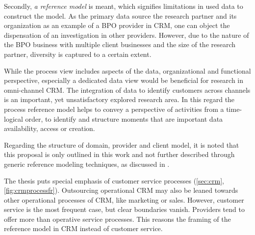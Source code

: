 Secondly, \textit{a reference model} is meant, which signifies limitations in used data to construct the model. As the primary data source the research partner and its organization as an example of a BPO provider in CRM, one can object the dispensation of an investigation in other providers. However, due to the nature of the BPO business with multiple client businesses and the size of the research partner, diversity is captured to a certain extent. 

While the process view includes aspects of the data, organizational and functional perspective, especially a dedicated data view would be beneficial for research in omni-channel \acrshort{CRM}. The integration of data to identify customers across channels is an important, yet unsatisfactory explored research area. In this regard the process reference model helps to convey a perspective of activities from a time-logical order, to identify and structure moments that are important \wrt data availability, access or creation. 

Regarding the structure of domain, provider and client model, it is noted that this proposal is only outlined in this work and not further described through generic reference modeling techniques, as discussed in \cite{delfmann2006adaptive, brocke2003referenzmodellierung}. 

The thesis puts special emphasis of customer service processes (\cf \ref{sec:crm},  \Fig \ref{fig:crmprocessfr}). Outsourcing operational \acrshort{CRM} may also be leaned towards other operational processes of CRM, like marketing or sales. However, customer service is the most frequent case, but clear boundaries vanish. Providers tend to offer more than operative service processes. This reasons the framing of the reference model in \acrshort{CRM} instead of customer service. 


